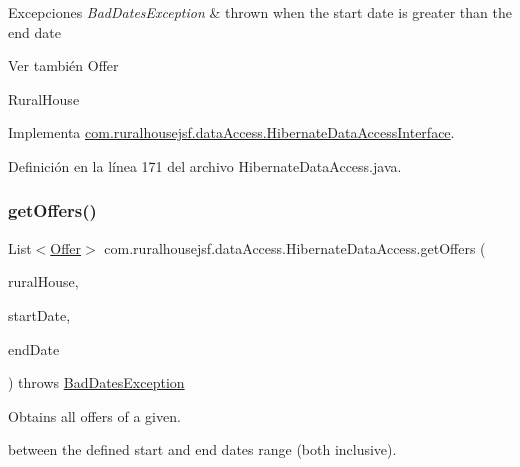 \begin{DoxyExceptions}{Excepciones}
{\em Bad\+Dates\+Exception} & thrown when the start date is greater than the end date\\
\hline
\end{DoxyExceptions}
\begin{DoxySeeAlso}{Ver también}
Offer 

Rural\+House 
\end{DoxySeeAlso}


Implementa \mbox{\hyperlink{interfacecom_1_1ruralhousejsf_1_1data_access_1_1_hibernate_data_access_interface_a731ab9e6ef26732d453046c9630c677b}{com.\+ruralhousejsf.\+data\+Access.\+Hibernate\+Data\+Access\+Interface}}.



Definición en la línea 171 del archivo Hibernate\+Data\+Access.\+java.

\mbox{\label{classcom_1_1ruralhousejsf_1_1data_access_1_1_hibernate_data_access_ad428053d12fae95599312c13951f9c87}} 
\subsubsection{\texorpdfstring{getOffers()}{getOffers()}\hspace{0.1cm}{\footnotesize\ttfamily [2/2]}}
{\footnotesize\ttfamily List$<$\mbox{\hyperlink{classcom_1_1ruralhousejsf_1_1domain_1_1_offer}{Offer}}$>$ com.\+ruralhousejsf.\+data\+Access.\+Hibernate\+Data\+Access.\+get\+Offers (\begin{DoxyParamCaption}\item[{\mbox{\hyperlink{classcom_1_1ruralhousejsf_1_1domain_1_1_rural_house}{Rural\+House}}}]{rural\+House,  }\item[{Date}]{start\+Date,  }\item[{Date}]{end\+Date }\end{DoxyParamCaption}) throws \mbox{\hyperlink{classcom_1_1ruralhousejsf_1_1exceptions_1_1_bad_dates_exception}{Bad\+Dates\+Exception}}}



Obtains all offers of a given. 


\begin{DoxyCode}{0}
\end{DoxyCode}
 between the defined start and end dates range (both inclusive).


